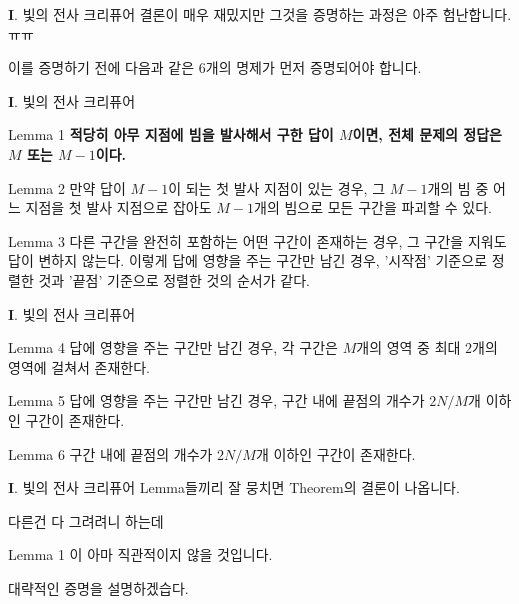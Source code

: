 \begin{frame}{\textbf{I}. 빛의 전사 크리퓨어}
    결론이 매우 재밌지만 그것을 증명하는 과정은 아주 험난합니다.ㅠㅠ
    
    \vspace{18pt}
    
    이를 증명하기 전에 다음과 같은 6개의 명제가 먼저 증명되어야 합니다.
\end{frame}

\begin{frame}{\textbf{I}. 빛의 전사 크리퓨어}
    \begin{block}{Lemma 1} \textbf{적당히 아무 지점에 빔을 발사해서 구한 답이 $M$이면, 전체 문제의 정답은 $M$ 또는 $M-1$이다.}\end{block}
    \begin{block}{Lemma 2} 만약 답이 $M-1$이 되는 첫 발사 지점이 있는 경우, 그 $M-1$개의 빔 중 어느 지점을 첫 발사 지점으로 잡아도 $M-1$개의 빔으로 모든 구간을 파괴할 수 있다.\end{block}
    \begin{block}{Lemma 3} 다른 구간을 완전히 포함하는 어떤 구간이 존재하는 경우, 그 구간을 지워도 답이 변하지 않는다. 이렇게 답에 영향을 주는 구간만 남긴 경우, '시작점' 기준으로 정렬한 것과 '끝점' 기준으로 정렬한 것의 순서가 같다.\end{block}
\end{frame}

\begin{frame}{\textbf{I}. 빛의 전사 크리퓨어}
    \begin{block}{Lemma 4} 답에 영향을 주는 구간만 남긴 경우, 각 구간은 $M$개의 영역 중 최대 $2$개의 영역에 걸쳐서 존재한다.\end{block}
    \begin{block}{Lemma 5} 답에 영향을 주는 구간만 남긴 경우, 구간 내에 끝점의 개수가 $2N/M$개 이하인 구간이 존재한다.\end{block}
    \begin{block}{Lemma 6} 구간 내에 끝점의 개수가 $2N/M$개 이하인 구간이 존재한다.\end{block}
\end{frame}

\begin{frame}{\textbf{I}. 빛의 전사 크리퓨어}
    \textcolor{ucpc-orange}{Lemma}들끼리 잘 뭉치면 \textcolor{ucpc-orange}{Theorem}의 결론이 나옵니다.
    
    \vspace{18pt}
    
    다른건 다 그려려니 하는데
    
    \textcolor{ucpc-orange}{Lemma 1} 이 아마 직관적이지 않을 것입니다.
    
    대략적인 증명을 설명하겠습다.
\end{frame}

